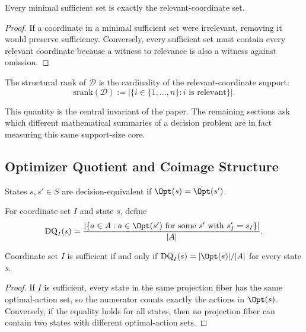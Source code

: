 \begin{proposition}\label{prop:minimal-relevant-equiv}
Every minimal sufficient set is exactly the relevant-coordinate set.
\end{proposition}

\begin{proof}
If a coordinate in a minimal sufficient set were irrelevant, removing it would preserve sufficiency. Conversely, every sufficient set must contain every relevant coordinate because a witness to relevance is also a witness against omission.
\end{proof}

\begin{definition}\label{def:srank}
The structural rank of $\mathcal{D}$ is the cardinality of the relevant-coordinate support:
\[
\mathrm{srank}(\mathcal{D}) :=
\left|\{i \in \{1,\ldots,n\} : i \text{ is relevant}\}\right|.
\]
\end{definition}

This quantity is the central invariant of the paper. The remaining sections ask which different mathematical summaries of a decision problem are in fact measuring this same support-size core.

\subsection{Optimizer Quotient and Coimage Structure}

\begin{definition}\label{def:decision-equiv}
States $s,s' \in S$ are decision-equivalent if $\Opt(s)=\Opt(s')$.
\end{definition}

\begin{definition}\label{def:decision-quotient}
For coordinate set $I$ and state $s$, define
\[
\DQ_I(s) =
\frac{|\{a \in A : a \in \Opt(s') \text{ for some } s' \text{ with } s'_I=s_I\}|}{|A|}.
\]
\end{definition}

\begin{proposition}\label{prop:sufficiency-char}
Coordinate set $I$ is sufficient if and only if $\DQ_I(s)=|\Opt(s)|/|A|$ for every state $s$.
\end{proposition}

\begin{proof}
If $I$ is sufficient, every state in the same projection fiber has the same optimal-action set, so the numerator counts exactly the actions in $\Opt(s)$. Conversely, if the equality holds for all states, then no projection fiber can contain two states with different optimal-action sets.
\end{proof}

